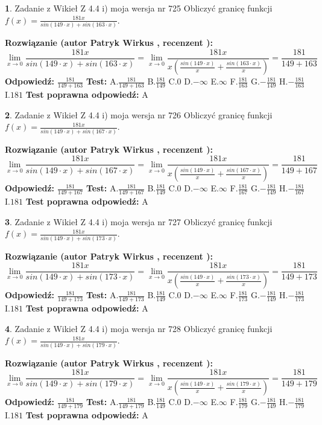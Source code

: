 \documentclass[12pt, a4paper]{article}
\theoremstyle{definition} %
\newtheorem{zad}{}
\newcommand{\zadStart}[1]{\begin{zad}#1\newline}
\newcommand{\zadStop}{\end{zad}}
\newcommand{\rozwStart}[2]{\noindent \textbf{Rozwiązanie (autor #1 , recenzent #2): }\newline}
\newcommand{\rozwStop}{\newline}
\newcommand{\odpStart}{\noindent \textbf{Odpowiedź:}\newline}
\newcommand{\odpStop}{\newline}
\newcommand{\testStart}{\noindent \textbf{Test:}\newline}
\newcommand{\testStop}{\newline}
\newcommand{\kluczStart}{\noindent \textbf{Test poprawna odpowiedź:}\newline}
\newcommand{\kluczStop}{\newline}
\begin{document}
\zadStart{Zadanie z Wikieł Z 4.4 i) moja wersja nr 725}
Obliczyć granicę funkcji $f(x)=\frac{181x}{sin(149\cdot x) +sin(163\cdot x)}$.
\zadStop
\rozwStart{Patryk Wirkus}{}
$$\lim\limits_{x\to 0}\frac{181x}{sin(149\cdot x) +sin(163\cdot x)}=\lim\limits_{x\to 0}\frac{181x}{x(\frac{sin(149\cdot x)}{x}+\frac{sin(163\cdot x)}{x})}=\frac{181}{149+163}$$
\rozwStop
\odpStart
$\frac{181}{149+163}$
\odpStop
\testStart
A.$\frac{181}{149+163}$
B.$\frac{181}{149}$
C.$0$
D.$-\infty$
E.$\infty$
F.$\frac{181}{163}$
G.$-\frac{181}{149}$
H.$-\frac{181}{163}$
I.$181$
\testStop
\kluczStart
A
\kluczStop



\zadStart{Zadanie z Wikieł Z 4.4 i) moja wersja nr 726}
Obliczyć granicę funkcji $f(x)=\frac{181x}{sin(149\cdot x) +sin(167\cdot x)}$.
\zadStop
\rozwStart{Patryk Wirkus}{}
$$\lim\limits_{x\to 0}\frac{181x}{sin(149\cdot x) +sin(167\cdot x)}=\lim\limits_{x\to 0}\frac{181x}{x(\frac{sin(149\cdot x)}{x}+\frac{sin(167\cdot x)}{x})}=\frac{181}{149+167}$$
\rozwStop
\odpStart
$\frac{181}{149+167}$
\odpStop
\testStart
A.$\frac{181}{149+167}$
B.$\frac{181}{149}$
C.$0$
D.$-\infty$
E.$\infty$
F.$\frac{181}{167}$
G.$-\frac{181}{149}$
H.$-\frac{181}{167}$
I.$181$
\testStop
\kluczStart
A
\kluczStop



\zadStart{Zadanie z Wikieł Z 4.4 i) moja wersja nr 727}
Obliczyć granicę funkcji $f(x)=\frac{181x}{sin(149\cdot x) +sin(173\cdot x)}$.
\zadStop
\rozwStart{Patryk Wirkus}{}
$$\lim\limits_{x\to 0}\frac{181x}{sin(149\cdot x) +sin(173\cdot x)}=\lim\limits_{x\to 0}\frac{181x}{x(\frac{sin(149\cdot x)}{x}+\frac{sin(173\cdot x)}{x})}=\frac{181}{149+173}$$
\rozwStop
\odpStart
$\frac{181}{149+173}$
\odpStop
\testStart
A.$\frac{181}{149+173}$
B.$\frac{181}{149}$
C.$0$
D.$-\infty$
E.$\infty$
F.$\frac{181}{173}$
G.$-\frac{181}{149}$
H.$-\frac{181}{173}$
I.$181$
\testStop
\kluczStart
A
\kluczStop



\zadStart{Zadanie z Wikieł Z 4.4 i) moja wersja nr 728}
Obliczyć granicę funkcji $f(x)=\frac{181x}{sin(149\cdot x) +sin(179\cdot x)}$.
\zadStop
\rozwStart{Patryk Wirkus}{}
$$\lim\limits_{x\to 0}\frac{181x}{sin(149\cdot x) +sin(179\cdot x)}=\lim\limits_{x\to 0}\frac{181x}{x(\frac{sin(149\cdot x)}{x}+\frac{sin(179\cdot x)}{x})}=\frac{181}{149+179}$$
\rozwStop
\odpStart
$\frac{181}{149+179}$
\odpStop
\testStart
A.$\frac{181}{149+179}$
B.$\frac{181}{149}$
C.$0$
D.$-\infty$
E.$\infty$
F.$\frac{181}{179}$
G.$-\frac{181}{149}$
H.$-\frac{181}{179}$
I.$181$
\testStop
\kluczStart
A
\kluczStop
\end{document}
